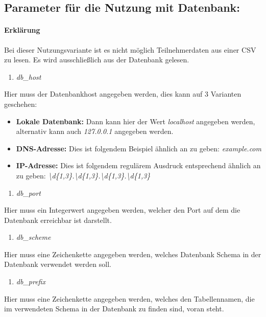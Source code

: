 \documentclass[12pt,parskip=full, pagea4]{scrreprt}
\begin{document}
			\subsection{Parameter für die Nutzung mit Datenbank:}
			\paragraph{Erkl\"arung}\leftskip=0cm Bei dieser Nutzungsvariante ist es nicht möglich Teilnehmerdaten aus einer CSV zu lesen. Es wird ausschließlich aus der Datenbank gelesen.
			\begin{enumerate}[resume]
				\item \textit{db\_host}
			\end{enumerate}
			\leftskip=1.5cm	Hier muss der Datenbankhost angegeben werden, dies kann auf 3 Varianten geschehen:
			\begin{itemize}
				\item \leftskip=1.5cm \textbf{Lokale Datenbank:} Dann kann hier der Wert \textit{localhost} angegeben werden, alternativ kann auch \textit{127.0.0.1} angegeben werden.
				\item \leftskip=1.5cm \textbf{DNS-Adresse:} Dies ist folgendem Beispiel ähnlich an zu geben: \textit{example.com} 
				\item \leftskip=1.5cm \textbf{IP-Adresse:} Dies ist folgendem regulärem Ausdruck entsprechend ähnlich an zu geben: \textit{\textbackslash d\{1,3\}.\textbackslash d\{1,3\}.\textbackslash d\{1,3\}.\textbackslash d\{1,3\}} 
			\end{itemize}
			\begin{enumerate}[resume]
				\item \textit{db\_port}
			\end{enumerate}
			\leftskip=1.5cm	Hier muss ein Integerwert angegeben werden, welcher den Port auf dem die Datenbank erreichbar ist darstellt.
			\begin{enumerate}[resume]
				\item \textit{db\_scheme}
			\end{enumerate}
			\leftskip=1.5cm	Hier muss eine Zeichenkette angegeben werden, welches Datenbank Schema in der Datenbank verwendet werden soll.
			\begin{enumerate}[resume]
				\item \textit{db\_prefix}
			\end{enumerate}
			\leftskip=1.5cm	Hier muss eine Zeichenkette angegeben werden, welches den Tabellennamen, die im verwendeten Schema in der Datenbank zu finden sind, voran steht.
\end{document}
